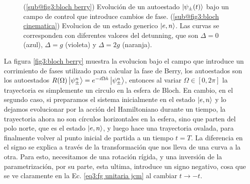 \begin{figure}[H]
\begin{subfigure}[h]{0.49\textwidth}
        \caption{}
        \label{fig3:bloch cinematica}
    \end{subfigure}
    \caption{(\ref{sub@fig3:bloch berry}) Evolución de un autoestado $\ket{\psi_\pm(t)}$ bajo un campo de control que introduce cambios de fase. (\ref{sub@fig3:bloch cinematica}) Evolucion de un estado generico $\ket{e,n}$. Las curvas se corresponden con diferentes valores del detunning, que son $\Delta=0$ (azul), $\Delta=g$ (violeta) y $\Delta=2g$ (naranja).}
    \label{fig3:esfera de bloch jcm}
\end{figure}
La figura \ref{fig3:bloch berry} muestra la evolucion bajo el campo que introduce un corrimiento de fases utilizado para calcular la fase de Berry, los autoestados son los autoestados $R(\Omega)\ket{\psi_\pm^n}=e^{-i\Omega \hat n}\ket{\psi_\pm^n}$, entonces al variar $\Omega\in [0,2\pi]$ la trayectoria es simplemente un circulo en la esfera de Bloch. En cambio, en el segundo caso, si preparamos el sistema inicialmente en el estado $\ket{e,n}$ y lo dejamos evolucionar por la acción del Hamiltoniano durante un tiempo, la trayectoria ahora no son círculos horizontales en la esfera, sino que parten del polo norte, que es el estado $\ket{e,n}$, y luego hace una trayectoria ovalada, para finalmente volver al punto inicial de partida a un tiempo $t=T$. La diferencia en el signo se explica a través de la transformación que nos lleva de una curva a la otra. Para esto, necesitamos de una rotación rígida, y una inversión de la parametrización, por su parte, esta ultima, introduce un signo negativo, cosa que se ve claramente en la Ec. \ref{eq3:fg unitaria jcm} al cambiar $t\rightarrow -t$.

